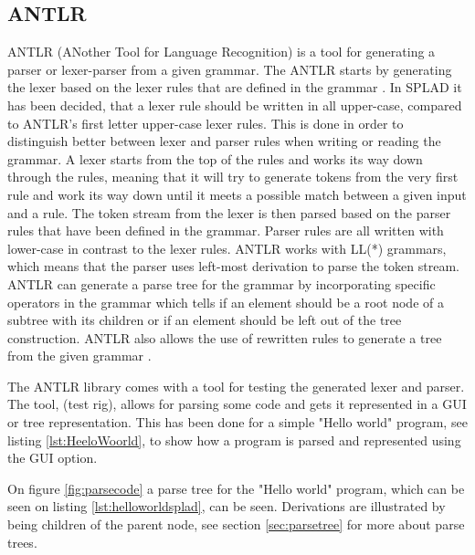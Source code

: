 \subsection{ANTLR}
ANTLR (ANother Tool for Language Recognition) is a tool for generating a parser or lexer-parser from a given grammar. The ANTLR starts by generating the lexer based on the lexer rules that are defined in the grammar \citep{ANTLRLexer}. In SPLAD it has been decided, that a lexer rule should be written in all upper-case, compared to ANTLR's first letter upper-case lexer rules. This is done in order to distinguish better between lexer and parser rules when writing or reading the grammar. A lexer starts from the top of the rules and works its way down through the rules, meaning that it will try to generate tokens from the very first rule and work its way down until it meets a possible match between a given input and a rule. 
The token stream from the lexer is then parsed based on the parser rules that have been defined in the grammar. Parser rules are all written with lower-case in contrast to the lexer rules. ANTLR works with LL(*) grammars, which means that the parser uses left-most derivation to parse the token stream. ANTLR can generate a parse tree for the grammar by incorporating specific operators in the grammar which tells if an element should be a root node of a subtree with its children or if an element should be left out of the tree construction. ANTLR also allows the use of rewritten rules to generate a tree from the given grammar \citep{ANTLRTreeCon}.

The ANTLR library comes with a tool for testing the generated lexer and parser. The tool, (test rig), allows for parsing some code and gets it represented
in a GUI or tree representation. This has been done for a simple "Hello world" program, see listing \ref{lst:HeeloWoorld}, to show how a program is parsed and represented using the GUI option.


On figure \ref{fig:parsecode} a parse tree for the "Hello world" program, which can be seen on listing \ref{lst:helloworldsplad}, can be seen. Derivations are illustrated by being children of the parent node, see section \ref{sec:parsetree} for more about parse trees.